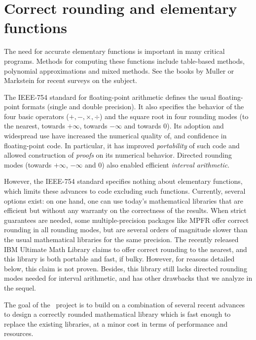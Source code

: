


\section{Correct rounding and elementary functions}
\label{sect:intro}

The need for accurate elementary functions is important in many
critical programs.  Methods for computing these functions include
table-based methods\cite{Far81,Tan91}, polynomial approximations and
mixed methods\cite{DauMor2k}. See the books by Muller\cite{Muller97} or
Markstein\cite{Markstein2000} for recent surveys on the subject.

The IEEE-754 standard for floating-point arithmetic\cite{IEEE754}
defines the usual floating-point formats (single and double
precision). It also specifies the behavior of the four basic operators
($+,-,\times,\div$) and the square root in four rounding modes (to the
nearest, towards $+\infty$, towards $-\infty$ and towards $0$). Its
adoption and widespread use have increased the numerical quality of,
and confidence in floating-point code. In particular, it has improved
\emph{portability} of such code and allowed construction of
\emph{proofs} on its numerical behavior. Directed rounding modes
(towards $+\infty$, $-\infty$ and $0$) also enabled efficient
\emph{interval arithmetic}\cite{Moore66,KKLRW93}.

However, the IEEE-754 standard specifies nothing about elementary
functions, which limits these advances to code excluding such
functions.  Currently, several options exist: on one hand, one can use
today's mathematical libraries that are efficient but without any
warranty on the correctness of the results. When strict guarantees are
needed, some multiple-precision packages like MPFR \cite{MPFRweb}
offer correct rounding in all rounding modes, but are several orders
of magnitude slower than the usual mathematical libraries for the same
precision. The recently released IBM Ultimate Math
Library\cite{IBMlibultimweb} claims to offer correct rounding to the nearest,
and this library is both portable and fast, if bulky. However, for
reasons detailed below, this claim is not proven. Besides, this
library still lacks directed rounding modes needed for interval
arithmetic, and has other drawbacks that we analyze in the sequel.


The  goal of the \crlibm\ project is to build on a combination of several
recent advances to design a correctly rounded mathematical
library which is fast enough to replace the existing libraries, at a
minor cost in terms of performance and resources.




